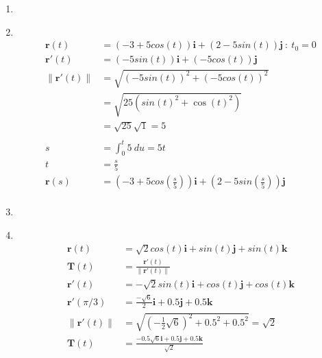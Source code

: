 \documentclass[11pt]{article}
\newcommand\Item[1][]{%
  \ifx\relax#1\relax  \item \else \item[#1] \fi
  \abovedisplayskip=0pt\abovedisplayshortskip=0pt~\vspace*{-\baselineskip}}
\begin{document}
\begin{enumerate}
\begin{enumerate}
              \Item
              \begin{align*}
                  \textbf{r}(t)        & = (-3+5cos(t))\textbf{i} + (2-5sin(t))\textbf{j} \ : \ t_0 = 0       \\
                  \textbf{r}'(t)       & = (-5sin(t))\textbf{i} + (-5cos(t))\textbf{j}                        \\
                  \| \textbf{r}'(t) \| & = \sqrt{(-5sin(t))^2 + (-5cos(t))^2}                                 \\
                                       & = \sqrt{25\left(sin(t)^{2}+\cos(t)^{2}\right)}                       \\
                                       & = \sqrt{25}\sqrt{1} = 5                                              \\\\
                  s                    & = \int_{0}^{t} 5 \ du = 5t                                           \\
                  t                    & = \frac{s}{5}                                                        \\
                  \textbf{r}(s)        & = (-3+5cos(\frac{s}{5}))\textbf{i} + (2-5sin(\frac{s}{5}))\textbf{j} \\
              \end{align*}

              \Item
              \begin{align*}
                  \textbf{r}(t)        & = \sqrt{2}cos(t)\textbf{i}+sin(t)\textbf{j}+sin(t)\textbf{k}              \\
                  \textbf{T}(t)        & = \frac{\textbf{r}'(t)}{\| \textbf{r}'(t) \|}                             \\
                  \textbf{r}'(t)       & = -\sqrt{2}sin(t)\textbf{i} + cos(t)\textbf{j} + cos(t)\textbf{k}         \\
                  \textbf{r}'(\pi/3)   & =  \frac{-\sqrt{6}}{2}\textbf{i} + 0.5\textbf{j} + 0.5\textbf{k}          \\
                  \| \textbf{r}'(t) \| & = \sqrt{\left(-\frac{1}{2}\sqrt{6}\right)^{2}+0.5^{2}+0.5^{2}} = \sqrt{2} \\
                  \textbf{T}(t)        & = \frac{-0.5\sqrt{6}\textbf{i} + 0.5\textbf{j} + 0.5\textbf{k}}{\sqrt{2}}
              \end{align*} \\


\end{enumerate}
\end{enumerate}
\end{document}
